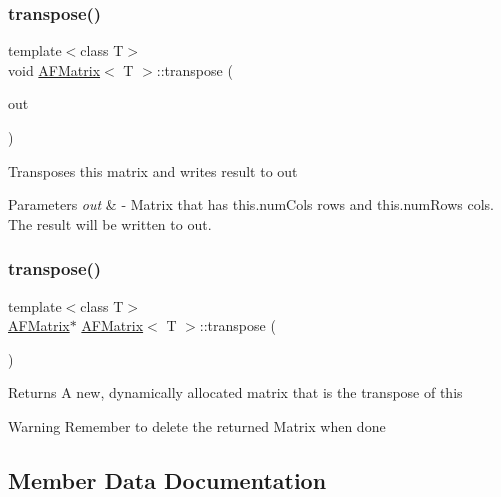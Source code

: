 \subsubsection{\texorpdfstring{transpose()}{transpose()}\hspace{0.1cm}{\footnotesize\ttfamily [1/2]}}
{\footnotesize\ttfamily template$<$class T$>$ \\
void \hyperlink{classAFMatrix}{A\+F\+Matrix}$<$ T $>$\+::transpose (\begin{DoxyParamCaption}\item[{\hyperlink{classAFMatrix}{A\+F\+Matrix}$<$ T $>$ $\ast$}]{out }\end{DoxyParamCaption})\hspace{0.3cm}{\ttfamily [inline]}}

Transposes this matrix and writes result to out 
\begin{DoxyParams}{Parameters}
{\em out} & -\/ Matrix that has this.\+num\+Cols rows and this.\+num\+Rows cols. The result will be written to out. \\
\hline
\end{DoxyParams}
\mbox{\label{classAFMatrix_afdd4d2d699db425d02bab1061366616a}} 
\subsubsection{\texorpdfstring{transpose()}{transpose()}\hspace{0.1cm}{\footnotesize\ttfamily [2/2]}}
{\footnotesize\ttfamily template$<$class T$>$ \\
\hyperlink{classAFMatrix}{A\+F\+Matrix}$\ast$ \hyperlink{classAFMatrix}{A\+F\+Matrix}$<$ T $>$\+::transpose (\begin{DoxyParamCaption}{ }\end{DoxyParamCaption})\hspace{0.3cm}{\ttfamily [inline]}}

\begin{DoxyReturn}{Returns}
A new, dynamically allocated matrix that is the transpose of this 
\end{DoxyReturn}
\begin{DoxyWarning}{Warning}
Remember to delete the returned Matrix when done 
\end{DoxyWarning}


\subsection{Member Data Documentation}
\mbox{\label{classAFMatrix_a124e51921d4275e00354d3af98399d1e}} 
